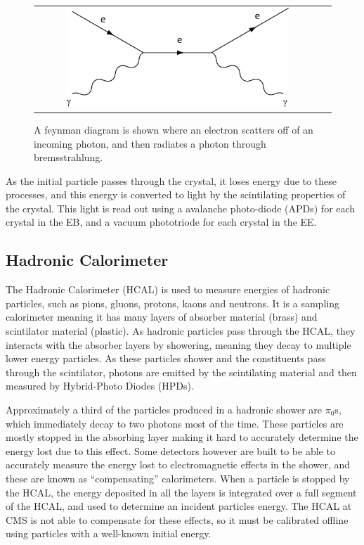 \begin{figure}[!ht]
\begin{center}
\begin{tabular}{cc}
\includegraphics[width=0.8\textwidth]{cms/figs/photon_brem.png}
\end{tabular}
\caption{
  A feynman diagram is shown where an electron scatters off of an incoming photon,
  and then radiates a photon through bremsstrahlung.
\label{fig:photon_brem}
}
\end{center}
\end{figure}

As the initial particle passes through the crystal, it loses energy due to these processes, and this energy is converted to light by the scintilating properties of the crystal.
This light is read out using a avalanche photo-diode (APDs) for each crystal in the EB, and a vacuum phototriode for each crystal in the EE.

\subsection{Hadronic Calorimeter}
\label {subs:HCAL}
The Hadronic Calorimeter (HCAL) is used to measure energies of hadronic particles, such as pions, gluons, protons, kaons and neutrons.
It is a sampling calorimeter meaning it has many layers of absorber material (brass) and scintilator material (plastic).
As hadronic particles pass through the HCAL, they interacts with the absorber layers by showering, meaning they decay to multiple lower energy particles.
As these particles shower and the constituents pass through the scintilator, photons are emitted by the scintilating material and then measured by Hybrid-Photo Diodes (HPDs).

Approximately a third of the particles produced in a hadronic shower are $\pi_{0}$s, which immediately decay to two photons most of the time.
These particles are mostly stopped in the absorbing layer making it hard to accurately determine the energy lost due to this effect.
Some detectors however are built to be able to accurately measure the energy lost to electromagnetic effects in the shower, and these are known as ``compensating'' calorimeters.
When a particle is stopped by the HCAL, the energy deposited in all the layers is integrated over a full segment of the HCAL, and used to determine an incident particles energy.
The HCAL at CMS is not able to compensate for these effects, so it must be calibrated offline using particles with a well-known initial energy.

